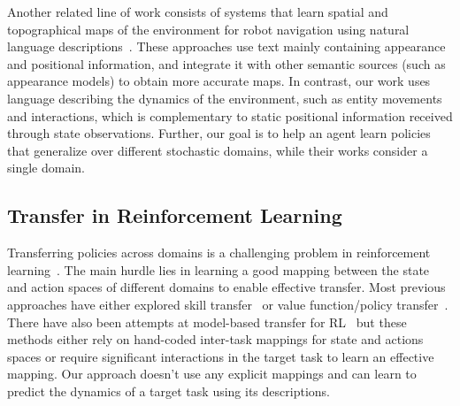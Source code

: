 Another related line of work consists of systems that learn spatial and topographical maps of the environment for robot navigation using natural language descriptions~. These approaches use text mainly containing appearance and positional information, and integrate it with other semantic sources (such as appearance models) to obtain more accurate maps. In contrast, our work uses language describing the dynamics of the environment, such as entity movements and interactions, which 
is complementary to static positional information received through state observations. Further, our goal is to help an agent learn policies that generalize over different stochastic domains, while their works consider a single domain.


\subsection{Transfer in Reinforcement Learning}
Transferring policies across domains is a challenging problem in reinforcement learning~. The main hurdle lies in learning a good mapping between the state and action spaces of different domains to enable effective transfer. Most previous approaches have either explored skill transfer~ or value function/policy transfer~. There have also been attempts at model-based transfer for RL~ but these methods either rely on hand-coded inter-task mappings for state and actions spaces or require significant interactions in the target task to learn an effective mapping. Our approach doesn't use any explicit mappings and can learn to predict the dynamics of a target task using its descriptions.

